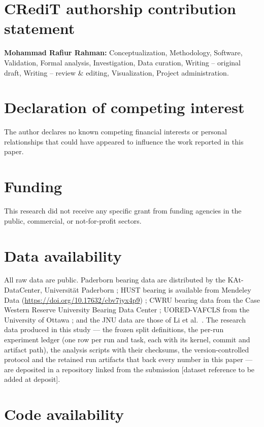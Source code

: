 \section*{CRediT authorship contribution statement}
\textbf{Mohammad Rafiur Rahman:} Conceptualization, Methodology, Software, Validation, Formal analysis, Investigation,
Data curation, Writing -- original draft, Writing -- review \& editing, Visualization, Project administration.

\section*{Declaration of competing interest}

The author declares no known competing financial interests or personal relationships that could have
appeared to influence the work reported in this paper.

\section*{Funding}
This research did not receive any specific grant from funding agencies in the public, commercial, or not-for-profit
sectors.

\section*{Data availability}

All raw data are public. Paderborn bearing data are distributed by the KAt-DataCenter, Universit\"at Paderborn
\cite{lessmeier2016}; HUST bearing is available from Mendeley Data (\url{https://doi.org/10.17632/cbv7jyx4p9})
\cite{thuan2023hust}; CWRU bearing data from the Case Western Reserve University Bearing Data Center \cite{smith2015};
UORED-VAFCLS from the University of Ottawa \cite{sehri2023uored}; and the JNU data are those of Li et al.\ \cite{li2013jnu}.
The research data produced in this study --- the frozen split definitions, the per-run experiment ledger (one row per run
and task, each with its kernel, commit and artifact path), the analysis scripts with their checksums, the version-controlled
protocol and the retained run artifacts that back every number in this paper --- are deposited in a repository linked from
the submission [dataset reference to be added at deposit].

\section*{Code availability}

